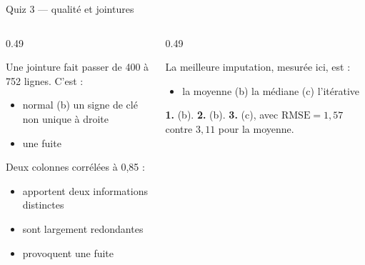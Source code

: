 \begin{frame}{Quiz 3 --- qualité et jointures}
\begin{columns}[t]
\begin{column}{0.49\textwidth}
\begin{qbox}[Question 1]
Une jointure fait passer de 400 à 752 lignes. C'est :
\begin{itemize}
  \item[(a)] normal \quad (b) un signe de clé non unique à droite
  \item[(c)] une fuite
\end{itemize}
\end{qbox}
\begin{qbox}[Question 2]
Deux colonnes corrélées à 0,85 :
\begin{itemize}
  \item[(a)] apportent deux informations distinctes
  \item[(b)] sont largement redondantes
  \item[(c)] provoquent une fuite
\end{itemize}
\end{qbox}
\end{column}
\begin{column}{0.49\textwidth}
\begin{qbox}[Question 3]
La meilleure imputation, mesurée ici, est :
\begin{itemize}
  \item[(a)] la moyenne \quad (b) la médiane \quad (c) l'itérative
\end{itemize}
\end{qbox}
\begin{solbox}[Réponses]
\textbf{1.} (b). \quad \textbf{2.} (b). \quad \textbf{3.} (c), avec
$\mathrm{RMSE}=1{,}57$ contre $3{,}11$ pour la moyenne.
\end{solbox}
\end{column}
\end{columns}
\end{frame}

